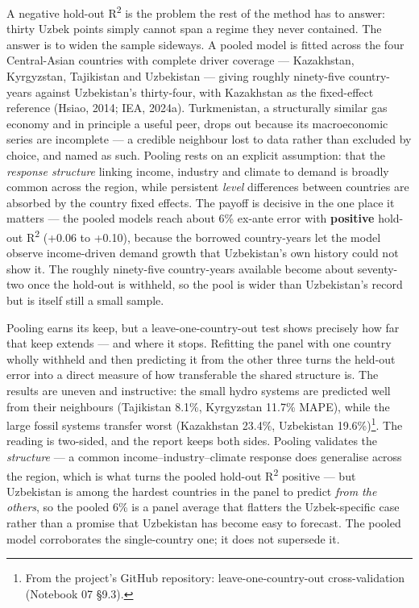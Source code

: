 \documentclass[10pt,twocolumn]{article}
\begin{document}
A negative hold-out R\textsuperscript{2} is the problem the rest of the method has to answer: thirty Uzbek points simply cannot span a regime they never contained. The answer is to widen the sample sideways. A pooled model is fitted across the four Central-Asian countries with complete driver coverage --- Kazakhstan, Kyrgyzstan, Tajikistan and Uzbekistan --- giving roughly ninety-five country-years against Uzbekistan's thirty-four, with Kazakhstan as the fixed-effect reference (Hsiao, 2014; IEA, 2024a). Turkmenistan, a structurally similar gas economy and in principle a useful peer, drops out because its macroeconomic series are incomplete --- a credible neighbour lost to data rather than excluded by choice, and named as such. Pooling rests on an explicit assumption: that the \textit{response structure} linking income, industry and climate to demand is broadly common across the region, while persistent \textit{level} differences between countries are absorbed by the country fixed effects. The payoff is decisive in the one place it matters --- the pooled models reach about 6\% ex-ante error with \textbf{positive} hold-out R\textsuperscript{2} (+0.06 to +0.10), because the borrowed country-years let the model observe income-driven demand growth that Uzbekistan's own history could not show it. The roughly ninety-five country-years available become about seventy-two once the hold-out is withheld, so the pool is wider than Uzbekistan's record but is itself still a small sample.

Pooling earns its keep, but a leave-one-country-out test shows precisely how far that keep extends --- and where it stops. Refitting the panel with one country wholly withheld and then predicting it from the other three turns the held-out error into a direct measure of how transferable the shared structure is. The results are uneven and instructive: the small hydro systems are predicted well from their neighbours (Tajikistan 8.1\%, Kyrgyzstan 11.7\% MAPE), while the large fossil systems transfer worst (Kazakhstan 23.4\%, Uzbekistan 19.6\%)\footnote{From the project's GitHub repository: leave-one-country-out cross-validation (Notebook 07 \S{}9.3).}. The reading is two-sided, and the report keeps both sides. Pooling validates the \textit{structure} --- a common income--industry--climate response does generalise across the region, which is what turns the pooled hold-out R\textsuperscript{2} positive --- but Uzbekistan is among the hardest countries in the panel to predict \textit{from the others}, so the pooled 6\% is a panel average that flatters the Uzbek-specific case rather than a promise that Uzbekistan has become easy to forecast. The pooled model corroborates the single-country one; it does not supersede it.
\end{document}
